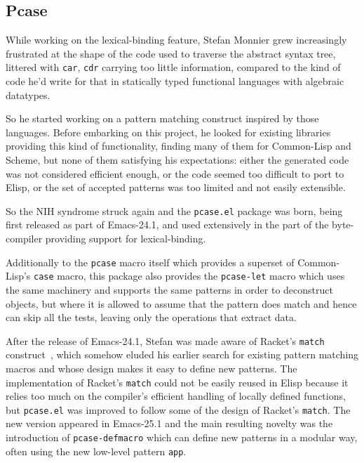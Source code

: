 \documentclass[format=acmsmall, review=false, screen=true]{acmart}
\newcommand \Elisp {Elisp}
\begin{document}
\subsection{Pcase}           %

While working on the lexical-binding feature, Stefan Monnier grew
increasingly frustrated at the shape of the code used to traverse the
abstract syntax tree, littered with \texttt{car}, \texttt{cdr} carrying too
little information, compared to the kind of code he'd write for that in
statically typed functional languages with algebraic datatypes.

So he started working on a pattern matching construct inspired by those
languages.  Before embarking on this project, he looked for existing
libraries providing this kind of functionality, finding many of them for
Common-Lisp and Scheme, but none of them satisfying his expectations: either
the generated code was not considered efficient enough, or the code seemed
too difficult to port to \Elisp{}, or the set of accepted patterns was too
limited and not easily extensible.

So the NIH syndrome struck again and the \texttt{pcase.el} package was born,
being first released as part of Emacs-24.1, and used extensively in the part
of the byte-compiler providing support for lexical-binding.

Additionally to the \texttt{pcase} macro itself which provides a superset of
Common-Lisp's \texttt{case} macro, this package also provides the
\texttt{pcase-let} macro which uses the same machinery and supports the same
patterns in order to deconstruct objects, but where it is allowed to assume
that the pattern does match and hence can skip all the tests, leaving only the
operations that extract data.

After the release of Emacs-24.1, Stefan was made aware of Racket's
\texttt{match} construct~\cite{RacketReference2018}, which somehow eluded
his earlier search for
existing pattern matching macros and whose design makes it easy to define
new patterns.  The implementation of Racket's \texttt{match} could not be
easily reused in \Elisp{} because it relies too much on the compiler's
efficient handling of locally defined functions, but \texttt{pcase.el} was
improved to follow some of the design of Racket's \texttt{match}.
The new version appeared in Emacs-25.1 and the main resulting novelty was the
introduction of \texttt{pcase-defmacro} which can define new patterns
in a modular way, often using the new low-level pattern \texttt{app}.
\end{document}

